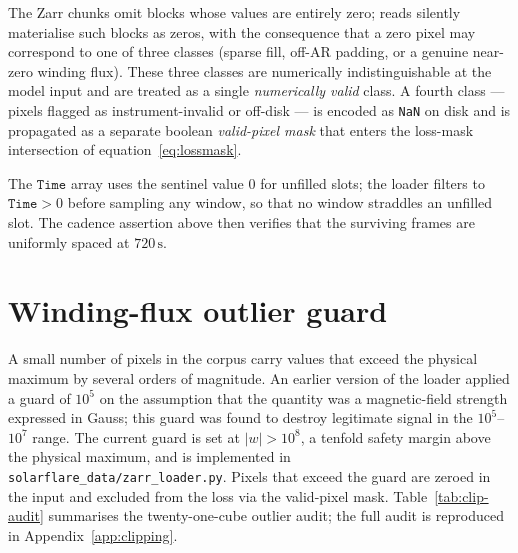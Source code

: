 The Zarr chunks omit blocks whose values are entirely zero; reads
silently materialise such blocks as zeros, with the consequence that
a zero pixel may correspond to one of three classes (sparse fill,
off-AR padding, or a genuine near-zero winding flux). These three
classes are numerically indistinguishable at the model input and are
treated as a single \emph{numerically valid} class. A fourth class
--- pixels flagged as instrument-invalid or off-disk --- is encoded as
\texttt{NaN} on disk and is propagated as a separate boolean
\emph{valid-pixel mask} that enters the loss-mask intersection
of equation~\eqref{eq:lossmask}.

The $\mathtt{Time}$ array uses the sentinel value $0$ for unfilled
slots; the loader filters to $\mathtt{Time}>0$ before sampling any
window, so that no window straddles an unfilled slot. The cadence
assertion above then verifies that the surviving frames are
uniformly spaced at $720\,\mathrm{s}$.

\section{Winding-flux outlier guard}
\label{sec:data-clip}

A small number of pixels in the corpus carry values that exceed the
physical maximum by several orders of magnitude. An earlier version
of the loader applied a guard of $10^{5}$ on the assumption that the
quantity was a magnetic-field strength expressed in Gauss; this
guard was found to destroy legitimate signal in the $10^{5}$--$10^{7}$
range. The current guard is set at $|w| > 10^{8}$, a tenfold safety
margin above the physical maximum, and is implemented in
\texttt{solarflare\_data/zarr\_loader.py}. Pixels that exceed the
guard are zeroed in the input and excluded from the loss via the
valid-pixel mask. Table~\ref{tab:clip-audit} summarises the
twenty-one-cube outlier audit; the full audit is reproduced in
Appendix~\ref{app:clipping}.

